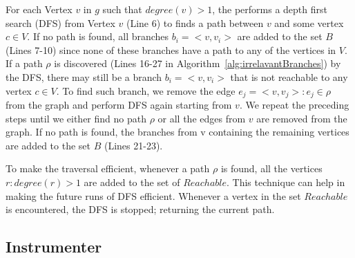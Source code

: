 For each Vertex $v$ in $g$ such that $degree(v) > 1$, the  performs a depth first search (DFS) from Vertex $v$ (Line 6) to finds a path between $v$ and some vertex $c \in V$.
If no path is found, all branches $b_i = <v, v_i>$ are added to the set $B$ (Lines 7-10) since none of these branches have a path to any of the vertices in $V$. If a path $\rho$ is discovered (Lines 16-27 in Algorithm~\ref{alg:irrelavantBranches}) by the DFS, there may still be a branch $b_i = <v, v_i>$ that is not reachable to any vertex $c \in V$. To find such branch, we remove the edge $e_j=<v, v_j>: e_j \in \rho$ from the graph and perform DFS again starting from $v$. We repeat the preceding steps until we either find no path $\rho$ or all the edges from $v$ are removed from the graph. If no path is found, the branches from v containing the remaining vertices are added to the set $B$ (Lines 21-23). 

To make the traversal efficient, whenever a path $\rho$ is found, all the vertices $r: degree(r)>1$ are added to the set of $Reachable$. This technique can help in making the future runs of DFS efficient. Whenever a vertex in the set $Reachable$ is encountered, the DFS is stopped; returning the current path.
 
\subsection{Instrumenter}


